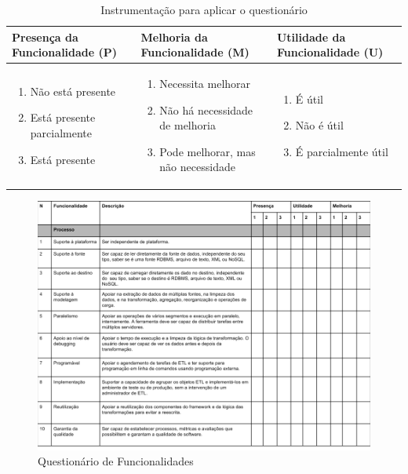\begin{table}[ht!]
	\centering
	\caption{Instrumentação para aplicar o questionário}
	\label{instrumentacao2}
	\begin{tabular}{|p{5cm}| p{5cm} | p{5cm}|}
		\hline
		Presença da Funcionalidade (P) & Melhoria da Funcionalidade (M) & Utilidade da Funcionalidade (U)\\
		\hline
		\begin{enumerate}
			\item Não está presente
			\item Está presente parcialmente
			\item Está presente
		\end{enumerate} & 
		\begin{enumerate}
			\item Necessita melhorar
			\item Não há necessidade de melhoria
			\item Pode melhorar, mas não necessidade
		\end{enumerate} &
		\begin{enumerate}
			\item É útil
			\item Não é útil
			\item É parcialmente útil
		\end{enumerate}\\
		\hline
		
	\end{tabular}
\end{table}

\begin{figure}[h!]
	\centering
	\includegraphics[scale=0.5]{fig/questionario_caracteristicas.png}
	\caption{Questionário de Funcionalidades}
	\label{questionariofuncionalidades}
\end{figure}

